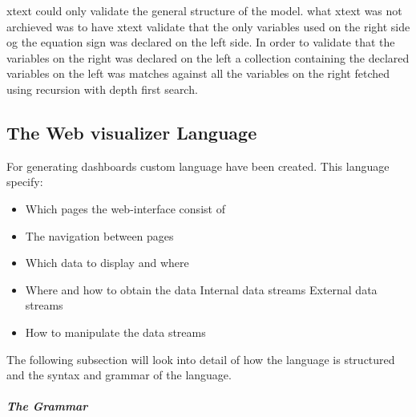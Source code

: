 xtext could only validate the general structure of the model.
what xtext was not archieved was to have xtext validate that the only variables used
on the right side og the equation sign was declared on the left side.
In order to validate that the variables on the right was declared on the left a
collection containing the declared variables on the left was matches against all the variables
on the right fetched using recursion with depth first search.

\subsection{The Web visualizer Language}
For generating dashboards custom language have been created.
This language specify:
\begin{itemize}
\item Which pages the web-interface consist of
\item The navigation between pages
\item Which data to display and where
\item Where and how to obtain the data
\subitem Internal data streams
\subitem External data streams
\item How to manipulate the data streams
\end{itemize}
The following subsection will look into detail of how the language is structured and the syntax and grammar of the language.

\subparagraph{The Grammar}

